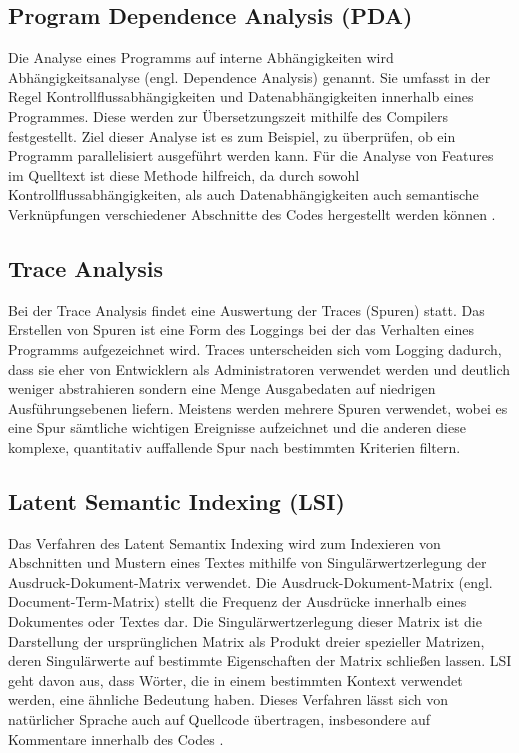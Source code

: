 \documentclass[runningheads,a4paper]{llncs}
\begin{document}
\subsection*{Program Dependence Analysis (PDA)}\label{PDA}

Die Analyse eines Programms auf interne Abhängigkeiten wird Abhängigkeitsanalyse (engl. Dependence Analysis) genannt. Sie umfasst in der Regel Kontrollflussabhängigkeiten und Datenabhängigkeiten innerhalb eines Programmes. Diese werden zur Übersetzungszeit mithilfe des Compilers festgestellt. Ziel dieser Analyse ist es zum Beispiel, zu überprüfen, ob ein Programm parallelisiert ausgeführt werden kann. Für die Analyse von Features im Quelltext ist diese Methode hilfreich, da durch sowohl Kontrollflussabhängigkeiten, als auch Datenabhängigkeiten auch semantische Verknüpfungen verschiedener Abschnitte des Codes hergestellt werden können \cite{PDA}.

\subsection*{Trace Analysis}
Bei der Trace Analysis findet eine Auswertung der Traces (Spuren) statt. Das Erstellen von Spuren ist eine Form des Loggings bei der das Verhalten eines Programms aufgezeichnet wird. Traces unterscheiden sich vom Logging dadurch, dass sie eher von Entwicklern als Administratoren verwendet werden und deutlich weniger abstrahieren sondern eine Menge Ausgabedaten auf niedrigen Ausführungsebenen liefern. Meistens werden mehrere Spuren verwendet, wobei es eine Spur sämtliche wichtigen Ereignisse aufzeichnet und die anderen diese komplexe, quantitativ auffallende Spur nach bestimmten Kriterien filtern. 

\subsection*{Latent Semantic Indexing (LSI)}

Das Verfahren des Latent Semantix Indexing wird zum Indexieren von Abschnitten und Mustern eines Textes mithilfe von Singulärwertzerlegung der Ausdruck-Dokument-Matrix verwendet. Die Ausdruck-Dokument-Matrix (engl. Document-Term-Matrix) stellt die Frequenz der Ausdrücke innerhalb eines Dokumentes oder Textes dar. Die Singulärwertzerlegung dieser Matrix ist die Darstellung der ursprünglichen Matrix als Produkt dreier spezieller Matrizen, deren Singulärwerte auf bestimmte Eigenschaften der Matrix schließen lassen. LSI geht davon aus, dass Wörter, die in einem bestimmten Kontext verwendet werden, eine ähnliche Bedeutung haben. Dieses Verfahren lässt sich von natürlicher Sprache auch auf Quellcode übertragen, insbesondere auf Kommentare innerhalb des Codes \cite{LSI}.
\end{document}
